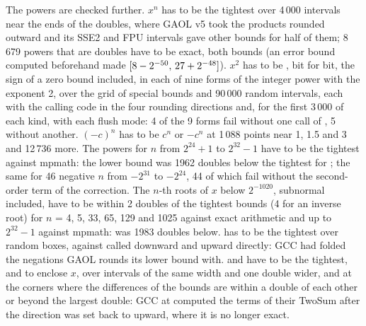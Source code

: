 \documentclass[12pt,a4paper,twoside,openright]{book}
\begin{document}
\medskip
The powers are checked further. $x^n$ has to be the tightest over 4\,000
intervals near the ends of the doubles, where GAOL v5 took the products
rounded outward and its SSE2 and FPU intervals gave other bounds for half of
them; 8\,679 powers that are doubles have to be exact, both bounds (an error
bound computed beforehand made 
$[8-2^{-50},\,27+2^{-48}]$). $x^2$ has to be , bit for bit,
the sign of a zero bound included, in each of nine forms of the integer power
with the exponent 2, over the grid of special bounds and 90\,000 random
intervals, each with the calling code in the four rounding directions and,
for the first 3\,000 of each kind, with each flush mode: 4 of the 9 forms
fail without one call of , 5 without another. $(-c)^n$ has to be
$c^n$ or $-c^n$ at 1\,088 points near 1, 1.5 and 3 and 12\,736 more. The
powers for $n$ from $2^{24}+1$ to $2^{32}-1$ have to be the tightest against
mpmath: the lower bound was 1962 doubles below the tightest for
; the same for 46 negative $n$ from
$-2^{31}$ to $-2^{24}$, 44 of which fail without the second-order term of
the correction. The $n$-th roots of $x$ below $2^{-1020}$, subnormal
included, have to be within 2 doubles of the tightest bounds (4 for an
inverse root) for $n$ = 4, 5, 33, 65, 129 and 1025 against exact arithmetic
and up to $2^{32}-1$ against mpmath: 
was 1983 doubles below.  has to be the tightest over
random boxes, against  called downward and upward directly:
GCC had folded the negations GAOL rounds its lower bound with.
 and  have to be the tightest, and
 to enclose $x$, over intervals of the same
width and one double wider, and at the corners where the differences of the
bounds are within a double of each other or beyond the largest double: GCC at
 computed the terms of their TwoSum after the direction was set
back to upward, where it is no longer exact.\newinvfive
\end{document}
